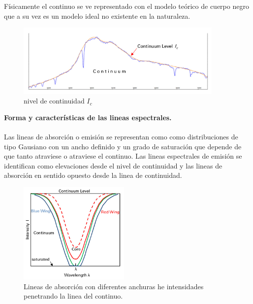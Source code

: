 \noindent Físicamente el continuo se ve representado con el modelo teórico de cuerpo negro que a su vez es un modelo  ideal no existente en la naturaleza.\\

\begin{figure}[htb!]
\centering
\includegraphics[width=0.9\textwidth]{images/8.jpeg}
\caption[Descripción versión comprimida]{nivel de continuidad $I_c$\cite{libro}}
 \label{fig2}
\end{figure}

\newpage


\noindent \textbf{Forma y características de las lineas espectrales.}\\\\

\noindent Las lineas de absorción o emisión se representan como como distribuciones de tipo Gausiano con un ancho definido y un grado de saturación que depende de que tanto atraviese o atraviese el continuo.
Las lineas espectrales de emisión se identifican como elevaciones desde el nivel de continuidad y las lineas de absorción en sentido opuesto desde la linea de continuidad.

\begin{figure}[htb!]
\centering
\includegraphics[width=0.48\textwidth]{images/9.jpeg}
\caption[Descripción versión comprimida]{Lineas de absorción con diferentes anchuras he intensidades penetrando la linea del continuo.\cite{libro}}
 \label{fig2}
\end{figure}

